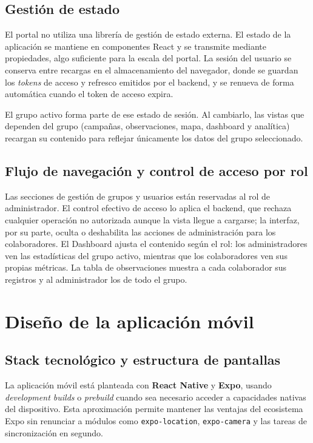\subsection{Gestión de estado}

El portal no utiliza una librería de gestión de estado externa. El estado de la
aplicación se mantiene en componentes React y se transmite mediante propiedades, algo
suficiente para la escala del portal. La sesión del usuario se conserva entre recargas
en el almacenamiento del navegador, donde se guardan los \textit{tokens} de acceso y
refresco emitidos por el backend, y se renueva de forma automática cuando el token de
acceso expira.

El grupo activo forma parte de ese estado de sesión. Al cambiarlo, las vistas que
dependen del grupo (campañas, observaciones, mapa, dashboard y analítica) recargan su
contenido para reflejar únicamente los datos del grupo seleccionado.

\subsection{Flujo de navegación y control de acceso por rol}

Las secciones de gestión de grupos y usuarios están reservadas al rol de
administrador. El control efectivo de acceso lo aplica el backend, que rechaza
cualquier operación no autorizada aunque la vista llegue a cargarse; la interfaz, por
su parte, oculta o deshabilita las acciones de administración para los colaboradores.
El Dashboard ajusta el contenido según el rol: los administradores ven las estadísticas
del grupo activo, mientras que los colaboradores ven sus propias métricas. La tabla de
observaciones muestra a cada colaborador sus registros y al administrador los de todo
el grupo.

\section{Diseño de la aplicación móvil}

\subsection{Stack tecnológico y estructura de pantallas}

La aplicación móvil está planteada con \textbf{React Native} y \textbf{Expo}, usando
\textit{development builds} o \textit{prebuild} cuando sea necesario acceder a
capacidades nativas del dispositivo. Esta aproximación permite mantener las ventajas
del ecosistema Expo sin renunciar a módulos como \texttt{expo-location},
\texttt{expo-camera} y las tareas de sincronización en segundo.


